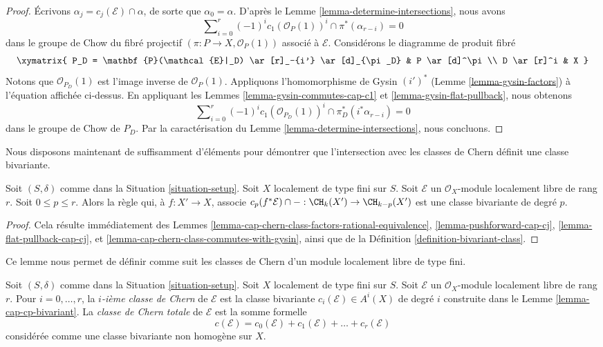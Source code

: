 \begin{proof}
Écrivons $\alpha_j = c_j(\mathcal{E}) \cap \alpha$, de sorte que $\alpha_0 = \alpha$.
D'après le Lemme \ref{lemma-determine-intersections}, nous avons
$$
\sum\nolimits_{i = 0}^r
(-1)^i c_1(\mathcal{O}_P(1))^i \cap
\pi^*(\alpha_{r - i}) = 0
$$
dans le groupe de Chow du fibré projectif
$(\pi : P \to X, \mathcal{O}_P(1))$
associé à $\mathcal{E}$. Considérons le diagramme de produit fibré
$$
\xymatrix{
P_D = \mathbf{P}(\mathcal{E}|_D) \ar[r]_-{i'} \ar[d]_{\pi_D} &
P \ar[d]^\pi \\
D \ar[r]^i & X
}
$$
Notons que $\mathcal{O}_{P_D}(1)$ est l'image inverse de $\mathcal{O}_P(1)$.
Appliquons l'homomorphisme de Gysin $(i')^*$ (Lemme \ref{lemma-gysin-factors}) à
l'équation affichée ci-dessus.
En appliquant les Lemmes \ref{lemma-gysin-commutes-cap-c1} et
\ref{lemma-gysin-flat-pullback}, nous obtenons
$$
\sum\nolimits_{i = 0}^r
(-1)^i c_1(\mathcal{O}_{P_D}(1))^i \cap
\pi_D^*(i^*\alpha_{r - i}) = 0
$$
dans le groupe de Chow de $P_D$.
Par la caractérisation du Lemme \ref{lemma-determine-intersections},
nous concluons.
\end{proof}

\noindent
Nous disposons maintenant de suffisamment d'éléments pour démontrer que
l'intersection avec les classes de Chern définit une classe bivariante.

\begin{lemma}
\label{lemma-cap-cp-bivariant}
Soit $(S, \delta)$ comme dans la Situation \ref{situation-setup}.
Soit $X$ localement de type fini sur $S$.
Soit $\mathcal{E}$ un $\mathcal{O}_X$-module localement libre
de rang $r$. Soit $0 \leq p \leq r$.
Alors la règle qui, à $f : X' \to X$, associe
$c_p(f^*\mathcal{E}) \cap - : \CH_k(X') \to \CH_{k - p}(X')$
est une classe bivariante de degré $p$.
\end{lemma}

\begin{proof}
Cela résulte immédiatement des Lemmes
\ref{lemma-cap-chern-class-factors-rational-equivalence},
\ref{lemma-pushforward-cap-cj},
\ref{lemma-flat-pullback-cap-cj}, et
\ref{lemma-cap-chern-class-commutes-with-gysin},
ainsi que de la Définition \ref{definition-bivariant-class}.
\end{proof}

\noindent
Ce lemme nous permet de définir comme suit les classes de Chern d'un module
localement libre de type fini.

\begin{definition}
\label{definition-chern-classes-final}
Soit $(S, \delta)$ comme dans la Situation \ref{situation-setup}.
Soit $X$ localement de type fini sur $S$.
Soit $\mathcal{E}$ un $\mathcal{O}_X$-module localement libre
de rang $r$. Pour $i = 0, \ldots, r$, la {\it $i$-ième classe de Chern}
de $\mathcal{E}$ est la classe bivariante
$c_i(\mathcal{E}) \in A^i(X)$ de degré $i$
construite dans le Lemme \ref{lemma-cap-cp-bivariant}. La
{\it classe de Chern totale} de $\mathcal{E}$ est la somme formelle
$$
c(\mathcal{E}) = 
c_0(\mathcal{E}) + c_1(\mathcal{E}) + \ldots + c_r(\mathcal{E})
$$
considérée comme une classe bivariante non homogène sur $X$.
\end{definition}

